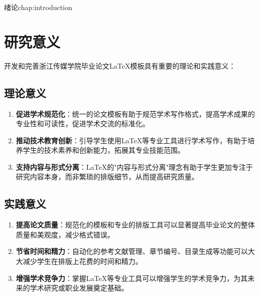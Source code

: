 \begin{cuzchapter}{绪论}{chap:introduction}
	\section{研究意义}\label{sec:significance}

	开发和完善浙江传媒学院毕业论文\LaTeX{}模板具有重要的理论和实践意义：

	\subsection{理论意义}

	\begin{enumerate}
		\item \textbf{促进学术规范化}：统一的论文模板有助于规范学术写作格式，提高学术成果的专业性和可读性，促进学术交流的标准化。

		\item \textbf{推动技术教育创新}：引导学生使用\LaTeX{}等专业工具进行学术写作，有助于培养学生的技术素养和创新能力，拓展其专业技能范围。

		\item \textbf{支持内容与形式分离}：\LaTeX{}的"内容与形式分离"理念有助于学生更加专注于研究内容本身，而非繁琐的排版细节，从而提高研究质量。
	\end{enumerate}

	\subsection{实践意义}

	\begin{enumerate}
		\item \textbf{提高论文质量}：规范化的模板和专业的排版工具可以显著提高毕业论文的整体质量和美观度，减少格式错误。

		\item \textbf{节省时间和精力}：自动化的参考文献管理、章节编号、目录生成等功能可以大大减少学生在排版上花费的时间和精力。

		\item \textbf{增强学术竞争力}：掌握\LaTeX{}等专业工具可以增强学生的学术竞争力，为其未来的学术研究或职业发展奠定基础。


\end{enumerate}
\end{cuzchapter}
